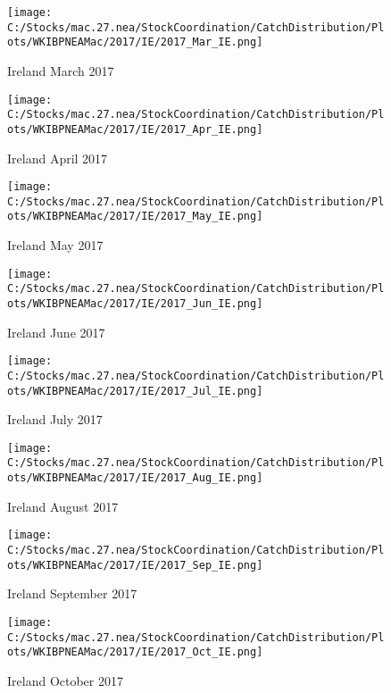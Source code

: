 \documentclass{article}
\begin{document}
\begin{figure}
	\centering
		\texttt{[image: C:/Stocks/mac.27.nea/StockCoordination/CatchDistribution/Plots/WKIBPNEAMac/2017/IE/2017\_Mar\_IE.png]}
	\caption{Ireland March 2017}
	\label{fig:2017_Mar_IE}
\end{figure}

\begin{figure}
	\centering
		\texttt{[image: C:/Stocks/mac.27.nea/StockCoordination/CatchDistribution/Plots/WKIBPNEAMac/2017/IE/2017\_Apr\_IE.png]}
	\caption{Ireland April 2017}
	\label{fig:2017_Apr_IE}
\end{figure}

\begin{figure}
	\centering
		\texttt{[image: C:/Stocks/mac.27.nea/StockCoordination/CatchDistribution/Plots/WKIBPNEAMac/2017/IE/2017\_May\_IE.png]}
	\caption{Ireland May 2017}
	\label{fig:2017_May_IE}
\end{figure}

\begin{figure}
	\centering
		\texttt{[image: C:/Stocks/mac.27.nea/StockCoordination/CatchDistribution/Plots/WKIBPNEAMac/2017/IE/2017\_Jun\_IE.png]}
	\caption{Ireland June 2017}
	\label{fig:2017_Jun_IE}
\end{figure}

\begin{figure}
	\centering
		\texttt{[image: C:/Stocks/mac.27.nea/StockCoordination/CatchDistribution/Plots/WKIBPNEAMac/2017/IE/2017\_Jul\_IE.png]}
	\caption{Ireland July 2017}
	\label{fig:2017_Jul_IE}
\end{figure}

\begin{figure}
	\centering
		\texttt{[image: C:/Stocks/mac.27.nea/StockCoordination/CatchDistribution/Plots/WKIBPNEAMac/2017/IE/2017\_Aug\_IE.png]}
	\caption{Ireland August 2017}
	\label{fig:2017_Aug_IE}
\end{figure}

\begin{figure}
	\centering
		\texttt{[image: C:/Stocks/mac.27.nea/StockCoordination/CatchDistribution/Plots/WKIBPNEAMac/2017/IE/2017\_Sep\_IE.png]}
	\caption{Ireland September 2017}
	\label{fig:2017_Sep_IE}
\end{figure}

\begin{figure}
	\centering
		\texttt{[image: C:/Stocks/mac.27.nea/StockCoordination/CatchDistribution/Plots/WKIBPNEAMac/2017/IE/2017\_Oct\_IE.png]}
	\caption{Ireland October 2017}
	\label{fig:2017_Oct_IE}
\end{figure}
\end{document}
